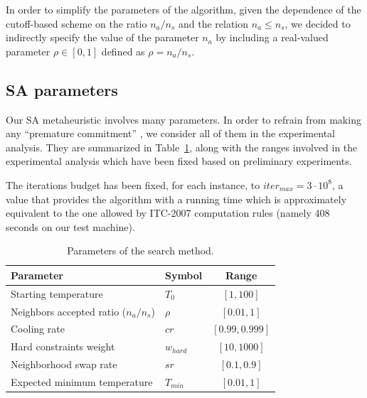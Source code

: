 \documentclass[authoryear,12pt]{article}
\begin{document}
In order to simplify the parameters of the algorithm, given the dependence of
the cutoff-based scheme on the ratio $n_a / n_s$ and the relation $n_a \leq
n_s$, we decided to indirectly specify the value of the parameter $n_a$ by
including a real-valued parameter $\rho \in [0, 1]$ defined as $\rho = n_a /
n_s$.

\subsection{SA parameters}
\label{sec:parameters}

Our SA metaheuristic involves many parameters. In order to refrain from making
any ``premature commitment'' \citep[see][]{Hoos12}, we consider all of them in
the experimental analysis. They are summarized in Table~\ref{tab:parameters},
along with the ranges involved in the experimental analysis which have been
fixed based on preliminary experiments.

The iterations budget has been fixed, for each instance, to $iter_{max} = 3
\cdot 10^8$, a value that provides the algorithm with a running time which is
approximately equivalent to the one allowed by ITC-2007 computation rules
(namely 408 seconds on our test machine).

{
    \renewcommand{\arraystretch}{1.1}
    \renewcommand{\tabcolsep}{4pt}

    \begin{table}
        \caption{Parameters of the search method\label{tab:parameters}.}
        \centering
        \begin{tabular}{llc}
            \toprule
            Parameter                 & Symbol & Range \\
            \midrule
            Starting temperature               & $T_{0}$        & $[1, 100]$ \\
            Neighbors accepted ratio ($n_a/n_s$) & $\rho$        & $[0.01, 1]$ \\
            Cooling rate                       & $cr$           & $[0.99, 0.999]$     \\
            Hard constraints weight            & $w_{hard}$     & $[10, 1000]$     \\
            Neighborhood swap rate             & $sr$           & $[0.1, 0.9]$          \\
            Expected minimum temperature       & $T_{min}$      & $[0.01, 1]$           \\
            \bottomrule
        \end{tabular}
    \end{table}
}
\end{document}
